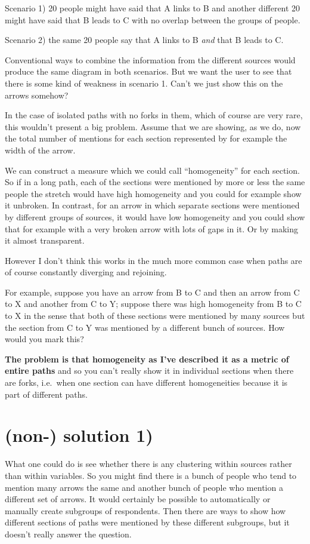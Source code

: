 \documentclass[
]{book}
\begin{document}
Scenario 1) 20 people might have said that A links to B and another different 20 might have said that B leads to C with no overlap between the groups of people.

Scenario 2) the same 20 people say that A links to B \emph{and} that B leads to C.

Conventional ways to combine the information from the different sources would produce the same diagram in both scenarios. But we want the user to see that there is some kind of weakness in scenario 1. Can't we just show this on the arrows somehow?

In the case of isolated paths with no forks in them, which of course are very rare, this wouldn't present a big problem. Assume that we are showing, as we do, now the total number of mentions for each section represented by for example the width of the arrow.

We can construct a measure which we could call ``homogeneity'' for each section. So if in a long path, each of the sections were mentioned by more or less the same people the stretch would have high homogeneity and you could for example show it unbroken. In contrast, for an arrow in which separate sections were mentioned by different groups of sources, it would have low homogeneity and you could show that for example with a very broken arrow with lots of gaps in it. Or by making it almost transparent.

However I don't think this works in the much more common case when paths are of course constantly diverging and rejoining.

For example, suppose you have an arrow from B to C and then an arrow from C to X and another from C to Y; suppose there was high homogeneity from B to C to X in the sense that both of these sections were mentioned by many sources but the section from C to Y was mentioned by a different bunch of sources. How would you mark this?

\textbf{The problem is that homogeneity as I've described it as a metric of entire paths} and so you can't really show it in individual sections when there are forks, i.e.~when one section can have different homogeneities because it is part of different paths.

\hypertarget{non--solution-1}{%
\section{(non-) solution 1)}\label{non--solution-1}}

What one could do is see whether there is any clustering within sources rather than within variables. So you might find there is a bunch of people who tend to mention many arrows the same and another bunch of people who mention a different set of arrows. It would certainly be possible to automatically or manually create subgroups of respondents. Then there are ways to show how different sections of paths were mentioned by these different subgroups, but it doesn't really answer the question.
\end{document}
